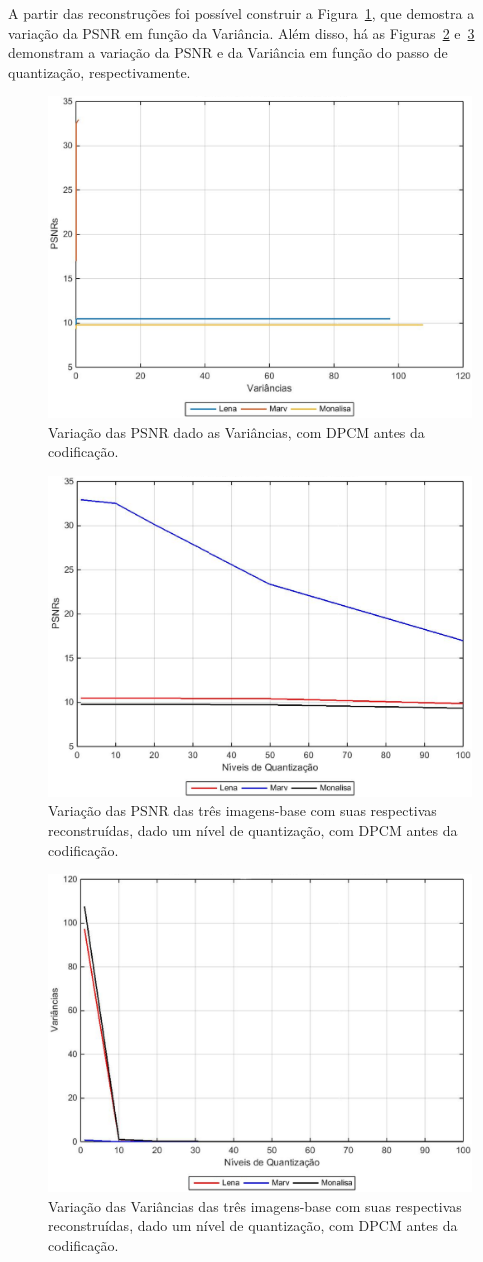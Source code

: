 \documentclass[conference]{Trabalho_3}
\begin{document}
A partir das reconstru\c{c}\~oes foi poss\'ivel construir a Figura~\ref{fig:psnrxvar_2}, que demostra a varia\c{c}\~ao da PSNR em fun\c{c}\~ao da Vari\^ancia. Al\'em disso, h\'a as Figuras~\ref{fig:psnr_2} e~\ref{fig:var_2} demonstram a varia\c{c}\~ao da PSNR e da Vari\^ancia em fun\c{c}\~ao do passo de quantiza\c{c}\~ao, respectivamente.

\begin{figure}[!t]
  \centering
  \includegraphics[width = 6.5 cm]{psnrxvar_2}
  \caption{Varia\c{c}\~ao das PSNR dado as Vari\^ancias, com DPCM antes da codifica\c{c}\~ao.}
  \label{fig:psnrxvar_2}
\end{figure}

\begin{figure}[!t]
  \centering
  \includegraphics[width = 6.5 cm]{psnr_2}
  \caption{Varia\c{c}\~ao das PSNR das tr\^es imagens-base com suas respectivas reconstru\'idas, dado um n\'ivel de quantiza\c{c}\~ao, com DPCM antes da codifica\c{c}\~ao.}
  \label{fig:psnr_2}
\end{figure}

\begin{figure}[!t]
  \centering
  \includegraphics[width = 6.5 cm]{var_2}
  \caption{Varia\c{c}\~ao das Vari\^ancias das tr\^es imagens-base com suas respectivas reconstru\'idas, dado um n\'ivel de quantiza\c{c}\~ao, com DPCM antes da codifica\c{c}\~ao.}
  \label{fig:var_2}
\end{figure}
\end{document}
